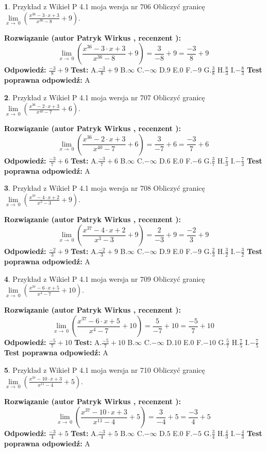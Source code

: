 \documentclass[12pt, a4paper]{article}
\theoremstyle{definition} %
\newtheorem{zad}{}
\newcommand{\zadStart}[1]{\begin{zad}#1\newline}
\newcommand{\zadStop}{\end{zad}}
\newcommand{\rozwStart}[2]{\noindent \textbf{Rozwiązanie (autor #1 , recenzent #2): }\newline}
\newcommand{\rozwStop}{\newline}
\newcommand{\odpStart}{\noindent \textbf{Odpowiedź:}\newline}
\newcommand{\odpStop}{\newline}
\newcommand{\testStart}{\noindent \textbf{Test:}\newline}
\newcommand{\testStop}{\newline}
\newcommand{\kluczStart}{\noindent \textbf{Test poprawna odpowiedź:}\newline}
\newcommand{\kluczStop}{\newline}
\begin{document}
\zadStart{Przykład z Wikieł P 4.1 moja wersja nr 706}
Obliczyć granicę $\lim\limits_{x\to\ 0}(\frac{x^{36}-3 \cdot x +3}{x^{36}-8}+9)$.
\zadStop
\rozwStart{Patryk Wirkus}{}
$$\lim\limits_{x\to\ 0}(\frac{x^{36}-3 \cdot x +3}{x^{36}-8}+9)=\frac{3}{-8}+9=\frac{-3}{8}+9$$
\rozwStop
\odpStart
$\frac{-3}{8}+9$
\odpStop
\testStart
A.$\frac{-3}{8}+9$
B.$\infty$
C.$-\infty$
D.$9$
E.$0$
F.$-9$
G.$\frac{3}{8}$
H.$\frac{8}{3}$
I.$-\frac{8}{3}$
\testStop
\kluczStart
A
\kluczStop



\zadStart{Przykład z Wikieł P 4.1 moja wersja nr 707}
Obliczyć granicę $\lim\limits_{x\to\ 0}(\frac{x^{36}-2 \cdot x +3}{x^{40}-7}+6)$.
\zadStop
\rozwStart{Patryk Wirkus}{}
$$\lim\limits_{x\to\ 0}(\frac{x^{36}-2 \cdot x +3}{x^{40}-7}+6)=\frac{3}{-7}+6=\frac{-3}{7}+6$$
\rozwStop
\odpStart
$\frac{-3}{7}+6$
\odpStop
\testStart
A.$\frac{-3}{7}+6$
B.$\infty$
C.$-\infty$
D.$6$
E.$0$
F.$-6$
G.$\frac{3}{7}$
H.$\frac{7}{3}$
I.$-\frac{7}{3}$
\testStop
\kluczStart
A
\kluczStop



\zadStart{Przykład z Wikieł P 4.1 moja wersja nr 708}
Obliczyć granicę $\lim\limits_{x\to\ 0}(\frac{x^{37}-4 \cdot x +2}{x^{3}-3}+9)$.
\zadStop
\rozwStart{Patryk Wirkus}{}
$$\lim\limits_{x\to\ 0}(\frac{x^{37}-4 \cdot x +2}{x^{3}-3}+9)=\frac{2}{-3}+9=\frac{-2}{3}+9$$
\rozwStop
\odpStart
$\frac{-2}{3}+9$
\odpStop
\testStart
A.$\frac{-2}{3}+9$
B.$\infty$
C.$-\infty$
D.$9$
E.$0$
F.$-9$
G.$\frac{2}{3}$
H.$\frac{3}{2}$
I.$-\frac{3}{2}$
\testStop
\kluczStart
A
\kluczStop



\zadStart{Przykład z Wikieł P 4.1 moja wersja nr 709}
Obliczyć granicę $\lim\limits_{x\to\ 0}(\frac{x^{37}-6 \cdot x +5}{x^{4}-7}+10)$.
\zadStop
\rozwStart{Patryk Wirkus}{}
$$\lim\limits_{x\to\ 0}(\frac{x^{37}-6 \cdot x +5}{x^{4}-7}+10)=\frac{5}{-7}+10=\frac{-5}{7}+10$$
\rozwStop
\odpStart
$\frac{-5}{7}+10$
\odpStop
\testStart
A.$\frac{-5}{7}+10$
B.$\infty$
C.$-\infty$
D.$10$
E.$0$
F.$-10$
G.$\frac{5}{7}$
H.$\frac{7}{5}$
I.$-\frac{7}{5}$
\testStop
\kluczStart
A
\kluczStop



\zadStart{Przykład z Wikieł P 4.1 moja wersja nr 710}
Obliczyć granicę $\lim\limits_{x\to\ 0}(\frac{x^{37}-10 \cdot x +3}{x^{11}-4}+5)$.
\zadStop
\rozwStart{Patryk Wirkus}{}
$$\lim\limits_{x\to\ 0}(\frac{x^{37}-10 \cdot x +3}{x^{11}-4}+5)=\frac{3}{-4}+5=\frac{-3}{4}+5$$
\rozwStop
\odpStart
$\frac{-3}{4}+5$
\odpStop
\testStart
A.$\frac{-3}{4}+5$
B.$\infty$
C.$-\infty$
D.$5$
E.$0$
F.$-5$
G.$\frac{3}{4}$
H.$\frac{4}{3}$
I.$-\frac{4}{3}$
\testStop
\kluczStart
A
\kluczStop
\end{document}
